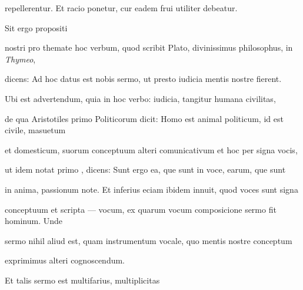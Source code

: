 \begin{VerbatimLatin}[firstnumber=1]
repellerentur. Et racio ponetur, cur eadem frui utiliter debeatur.

\indentK Sit ergo propositi
\end{VerbatimLatin}



\renewcommand{\theFancyVerbLine}{03-\arabic{FancyVerbLine}\phantom{a}}
\begin{VerbatimLatin}[firstnumber=32]
nostri pro themate hoc verbum, quod scribit Plato, divinissimus philosophus, in \textit{Thymeo},

dicens: Ad hoc datus est nobis sermo, ut presto iudicia mentis nostre fierent{\color{red}\footnotemark[8]}.

Ubi est advertendum, quia in hoc verbo: iudicia, tangitur humana civilitas,

de qua Aristotiles primo Politicorum dicit: Homo est animal politicum, id est civile, masuetum

et domesticum, suorum conceptuum alteri comunicativum et hoc per signa vocis,

ut idem notat primo  , dicens: Sunt ergo ea, que sunt in voce, earum, que sunt

in anima, passionum note. Et inferius eciam ibidem innuit, quod voces sunt signa

conceptuum et scripta — vocum, ex quarum vocum composicione sermo fit hominum. Unde

sermo nihil aliud est, quam instrumentum vocale, quo mentis nostre conceptum
\end{VerbatimLatin}


\renewcommand{\theFancyVerbLine}{\textcolor{green}{03-41\alph{FancyVerbLine}}}

\begin{VerbatimLatin}[firstnumber=1]
exprimimus alteri cognoscendum{\color{red}\footnotemark[10]}.

\indentK  Et talis sermo est multifarius, multiplicitas
\end{VerbatimLatin}


